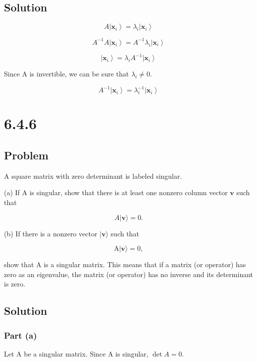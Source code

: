 \documentclass[12pt]{article}
\begin{document}
\subsection{Solution}

\[
    A \left|\mathbf{x}_i\right\rangle = \lambda_i \left|\mathbf{x}_i\right\rangle
\]

\[
    A^{-1} A \left|\mathbf{x}_i\right\rangle = A^{-1} \lambda_i \left|\mathbf{x}_i\right\rangle
\]

\[
    \left|\mathbf{x}_i\right\rangle = \lambda_i A^{-1} \left|\mathbf{x}_i\right\rangle
\]

Since A is invertible, we can be sure that \(\lambda_i \neq 0\).

\[
    A^{-1} \left|\mathbf{x}_i\right\rangle = \lambda_i^{-1} \left|\mathbf{x}_i\right\rangle
\]

\newpage
\section{6.4.6}

\subsection{Problem}

A square matrix with zero determinant is labeled singular.

(a) If \(\mathrm{A}\) is singular, show that there is at least one nonzero column vector \(\mathbf{v}\) such that

\[
    A|\mathbf{v}\rangle=0 .
\]

(b) If there is a nonzero vector \(|\mathbf{v}\rangle \) such that

\[
    \mathrm{A}|\mathbf{v}\rangle=0,
\]

show that \(\mathrm{A}\) is a singular matrix. This means that if a matrix (or operator) has zero as an eigenvalue, the matrix (or operator) has no inverse and its determinant is zero.

\subsection{Solution}

\subsubsection{Part (a)}

Let A be a singular matrix. Since A is singular, \(\det A = 0\).
\end{document}

